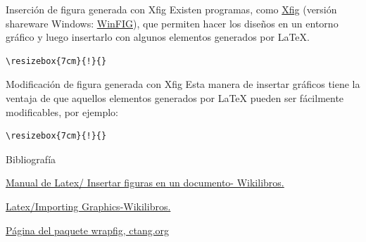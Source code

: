 \documentclass{beamer}
\begin{document}
\begin{frame}[fragile]{Inserci\'on de figura generada con Xfig}
Existen programas, como \href{http://mcj.sourceforge.net}{Xfig} {\small (versi\'on shareware Windows: \href{http://winfig.com/}{WinFIG})}, 
que permiten hacer los diseños en un entorno gráfico y luego 
insertarlo con algunos elementos generados por \LaTeX .

\begin{verbatim}
\resizebox{7cm}{!}{}
\end{verbatim}
\begin{center}
\resizebox{6cm}{!}{}
\end{center}
\end{frame}

\begin{frame}[fragile]{Modificaci\'on de figura generada con Xfig}
Esta manera de insertar gr\'aficos tiene la ventaja de que aquellos elementos generados
por \LaTeX $ $ pueden ser f\'acilmente modificables, por ejemplo:

\begin{verbatim}
\resizebox{7cm}{!}{}
\end{verbatim}
\begin{center}
\resizebox{6cm}{!}{}
\end{center}
\end{frame}





\begin{frame}[fragile]{Bibliograf\'ia}
\begin{thebibliography}{10}
 \href{http://es.wikibooks.org/wiki/Manual_de_LaTeX/Insertar_figuras_en_un_documento}{Manual de Latex/ Insertar figuras en un documento- Wikilibros.}

\href{http://en.wikibooks.org/wiki/LaTeX/Importing_Graphics}{Latex/Importing Graphics-Wikilibros.}

 \href{http://www.ctan.org/pkg/wrapfig}{P\'agina del paquete wrapfig, ctang.org}

\end{thebibliography}
\end{frame}
\end{document}
